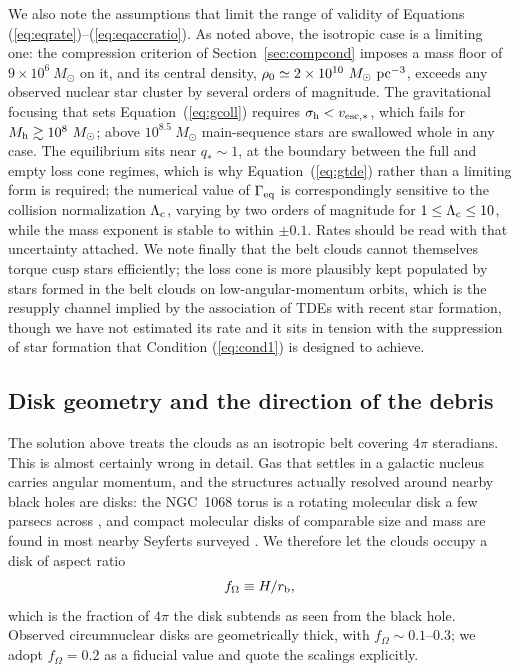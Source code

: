 \documentclass[preprint2]{aastex}
\newcommand{\msun}{M_{\odot}\xspace}
\begin{document}
We also note the assumptions that limit the range of validity of Equations (\ref{eq:eqrate})--(\ref{eq:eqaccratio}). As noted above, the isotropic case is a limiting one: the compression criterion of Section~\ref{sec:compcond} imposes a mass floor of $9 \times 10^{6}~\msun$ on it, and its central density, $\rho_{0} \simeq 2 \times 10^{10}~\msun~{\rm pc}^{-3}$, exceeds any observed nuclear star cluster by several orders of magnitude. The gravitational focusing that sets Equation~(\ref{eq:gcoll}) requires $\sigma_{\rm h} < v_{\rm esc,\ast}$, which fails for $M_{\rm h} \gtrsim 10^{8}~\msun$; above $10^{8.5}~\msun$ main-sequence stars are swallowed whole in any case. The equilibrium sits near $q_{\ast} \sim 1$, at the boundary between the full and empty loss cone regimes, which is why Equation~(\ref{eq:gtde}) rather than a limiting form is required; the numerical value of $\Gamma_{\rm eq}$ is correspondingly sensitive to the collision normalization $\Lambda_{\rm c}$, varying by two orders of magnitude for $1 \le \Lambda_{\rm c} \le 10$, while the mass exponent is stable to within $\pm 0.1$. Rates should be read with that uncertainty attached. We note finally that the belt clouds cannot themselves torque cusp stars efficiently; the loss cone is more plausibly kept populated by stars formed in the belt clouds on low-angular-momentum orbits, which is the resupply channel implied by the association of TDEs with recent star formation, though we have not estimated its rate and it sits in tension with the suppression of star formation that Condition (\ref{eq:cond1}) is designed to achieve.

\subsection{Disk geometry and the direction of the debris}\label{subsec:disk}

The solution above treats the clouds as an isotropic belt covering $4\pi$ steradians. This is almost certainly wrong in detail. Gas that settles in a galactic nucleus carries angular momentum, and the structures actually resolved around nearby black holes are disks: the NGC~1068 torus is a rotating molecular disk a few parsecs across \citep{GarciaBurillo:2016a,Imanishi:2018a,Impellizzeri:2019a}, and compact molecular disks of comparable size and mass are found in most nearby Seyferts surveyed \citep{Combes:2019a,GarciaBurillo:2021a}. We therefore let the clouds occupy a disk of aspect ratio
\begin{equation}
f_{\Omega} \equiv H/r_{\rm b},
\end{equation}
which is the fraction of $4\pi$ the disk subtends as seen from the black hole. Observed circumnuclear disks are geometrically thick, with $f_{\Omega} \sim 0.1$--$0.3$; we adopt $f_{\Omega} = 0.2$ as a fiducial value and quote the scalings explicitly.
\end{document}
